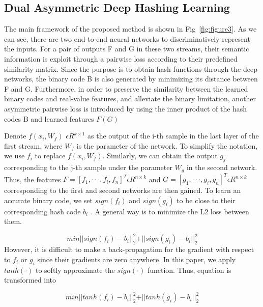 \subsection{Dual Asymmetric Deep Hashing Learning}
	The main framework of the proposed method is shown in Fig~\ref{fig:figure3}. As we can see, there are two end-to-end neural networks to discriminatively represent the inputs. For a pair of outputs F and G in these two streams, their semantic information is exploit through a pairwise loss according to their predefined similarity matrix. Since the purpose is to
obtain hash functions through the deep networks, the binary code B is also generated by minimizing its distance between
F and G. Furthermore, in order to preserve the similarity between the learned binary codes and real-value features, and
alleviate the binary limitation, another asymmetric pairwise loss is introduced by using the inner product of the hash codes
B and learned features $F (G)$

Denote $f (x_{i}, W_{f} )$ $\epsilon R^{k\times 1}$ as the output of the i-th sample in the last layer of the first stream, where $W_{f}$ is the parameter of the network. To simplify the notation, we use $f_{i}$ to replace $f (x_{i}, W_{f} )$. Similarly, we can obtain the output $g_{j}$ corresponding to the j-th sample under the parameter $W_{g}$ in the second network. Thus, the features $F = [f_{1} , · · · , f_{i} , f_{n} ]^T \epsilon R^{n\times k}$ and $G = [g_{1}, · · · , g_{i} , g_{n}]^T \epsilon R^{n\times k}$ corresponding to the first and second networks are then gained.
To learn an accurate binary code, we set $sign(f_{i})$ and $sign(g_{i})$ to be close to their corresponding hash code $b_{i}$ . A
general way is to minimize the L2 loss between them.

\begin{equation}
	    min \vert \vert sign(f_{i}) - b_{i} \vert \vert ^2 _{2} + \vert \vert sign(g_{i}) - b_{i} \vert \vert^2_{2}
\label{eq1}
\end{equation}
However, it is difficult to make a back-propagation for the gradient with respect to $f_{i}$ or $g_{i}$ since their gradients are zero anywhere. In this paper, we apply $tanh(·)$ to softly approximate the $sign(·)$ function. Thus, equation is transformed into

\begin{equation}
	    min \vert \vert tanh(f_{i}) - b_{i} \vert \vert ^2 _{2} + \vert \vert tanh(g_{i}) - b_{i} \vert \vert^2_{2}
\label{eq2}
\end{equation}


